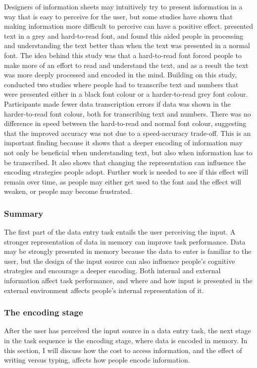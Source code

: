 Designers of information sheets may intuitively try to present information in a way that is easy to perceive for the user, but some studies have shown that making information more difficult to perceive can have a positive effect.
\citet{Diemand-Yauman2011} presented text in a grey and hard-to-read font, and found this aided people in processing and understanding the text better than when the text was presented in a normal font. The idea behind this study was that a hard-to-read font forced people to make more of an effort to read and understand the text, and as a result the text was more deeply processed and encoded in the mind. Building on this study, \citet{Soboczenski2013} conducted two studies where people had to transcribe text and numbers that were presented either in a black font colour or a harder-to-read grey font colour. Participants made fewer data transcription errors if data was shown in the harder-to-read font colour, both for transcribing text and numbers. There was no difference in speed between the hard-to-read and normal font colour, suggesting that the improved accuracy was not due to a speed-accuracy trade-off. This is an important finding because it shows that a deeper encoding of information may not only be beneficial when understanding text, but also when information has to be transcribed. It also shows that changing the representation can influence the encoding strategies people adopt.
Further work is needed to see if this effect will remain over time, as people may either get used to the font and the effect will weaken, or people may become frustrated. 

\subsubsection{Summary}
The first part of the data entry task entails the user perceiving the input.  A stronger representation of data in memory can improve task performance. Data may be strongly presented in memory because the data to enter is familiar to the user, but the design of the input source can also influence people's cognitive strategies and encourage a deeper encoding. Both internal and external information affect task performance, and where and how input is presented in the external environment affects people's internal representation of it. 

\subsubsection{The encoding stage}\label{sec:Encoding_stage}
After the user has perceived the input source in a data entry task, the next stage in the task sequence is the encoding stage, where data is encoded in memory. In this section, I will discuss how the cost to access information, and the effect of writing versus typing, affects how people encode information.


